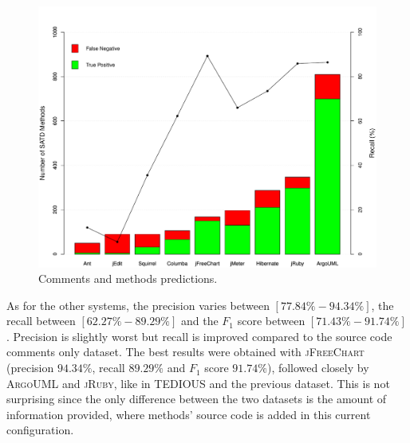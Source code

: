 \begin{figure}[h]
	\centering
	\includegraphics[scale=0.5]{figs/all-comments-pred.pdf}
	\caption{Comments and methods predictions.}
	\label{fig:all-comments-pred}
	\vspace{-4mm}
\end{figure}

As for the other systems, the precision varies between $[77.84\%-94.34\%]$, the recall between $[62.27\%-89.29\%]$ and the $F_1$ score between $[71.43\%-91.74\%]$. Precision is slightly worst but recall is improved compared to the source code comments only dataset. The best results were obtained with \textsc{jFreeChart} (precision $94.34\%$, recall $89.29\%$ and $F_1$ score $91.74\%$), followed closely by \textsc{ArgoUML} and \textsc{jRuby}, like in TEDIOUS and the previous dataset. This is not surprising since the only difference between the two datasets is the amount of information provided, where methods' source code is added in this current configuration.


